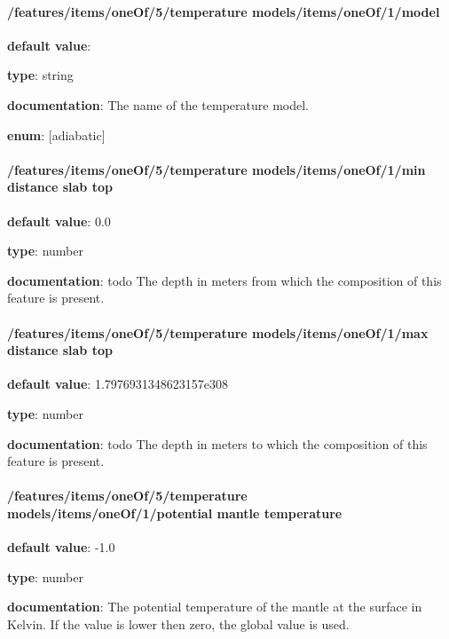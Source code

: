 \paragraph{/features/items/oneOf/5/temperature models/items/oneOf/1/model} \begin{itemized}
\item {\bf default value}: 
\item {\bf type}: string
\item {\bf documentation}: The name of the temperature model.
\item {\bf enum}: [adiabatic]\end{itemized}\paragraph{/features/items/oneOf/5/temperature models/items/oneOf/1/min distance slab top} \begin{itemized}
\item {\bf default value}: 0.0
\item {\bf type}: number
\item {\bf documentation}: todo The depth in meters from which the composition of this feature is present.
\end{itemized}\paragraph{/features/items/oneOf/5/temperature models/items/oneOf/1/max distance slab top} \begin{itemized}
\item {\bf default value}: 1.7976931348623157e308
\item {\bf type}: number
\item {\bf documentation}: todo The depth in meters to which the composition of this feature is present.
\end{itemized}\paragraph{/features/items/oneOf/5/temperature models/items/oneOf/1/potential mantle temperature} \begin{itemized}
\item {\bf default value}: -1.0
\item {\bf type}: number
\item {\bf documentation}: The potential temperature of the mantle at the surface in Kelvin. If the value is lower then zero, the global value is used.

\end{itemized}

